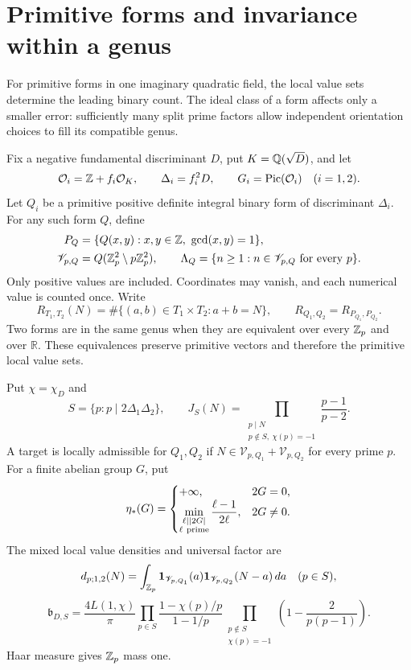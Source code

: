 \section{Primitive forms and invariance within a genus}\label{sec:forms}

For primitive forms in one imaginary quadratic field, the local value
sets determine the leading binary count. The ideal class of a form
affects only a smaller error: sufficiently many split prime factors
allow independent orientation choices to fill its compatible genus.

Fix a negative fundamental discriminant \(D\), put \(K=\mathbb Q(\sqrt D)\),
and let
\[
 \mathcal O_i=\mathbb Z+f_i\mathcal O_K,\qquad
 \Delta_i=f_i^2D,\qquad G_i=\operatorname{Pic}(\mathcal O_i)
 \quad(i=1,2).
\]
Let \(Q_i\) be a primitive positive definite integral binary form of
discriminant \(\Delta_i\). For any such form \(Q\), define
\[
 \begin{aligned}
 P_Q&=\{Q(x,y):x,y\in\mathbb Z,\ \gcd(x,y)=1\},\\
 \mathscr V_{p,Q}&=Q(\mathbb Z_p^2\setminus p\mathbb Z_p^2),\qquad
 \Lambda_Q=\{n\ge1:n\in\mathscr V_{p,Q}\text{ for every }p\}.
 \end{aligned}
\]
Only positive values are included. Coordinates may vanish, and each
numerical value is counted once. Write
\[
 R_{T_1,T_2}(N)=\#\{(a,b)\in T_1\times T_2:a+b=N\},\qquad
 R_{Q_1,Q_2}=R_{P_{Q_1},P_{Q_2}}.
\]
Two forms are in the same genus when they are equivalent over every
\(\mathbb Z_p\) and over \(\mathbb R\). These equivalences preserve primitive
vectors and therefore the primitive local value sets.

Put \(\chi=\chi_D\) and
\[
 S=\{p:p\mid2\Delta_1\Delta_2\},\qquad
 J_S(N)=\prod_{\substack{p\mid N\\p\notin S,\ \chi(p)=-1}}
                              \frac{p-1}{p-2}.
\]
A target is locally admissible for \(Q_1,Q_2\) if
\(N\in\mathscr V_{p,Q_1}+\mathscr V_{p,Q_2}\) for every prime \(p\).
For a finite abelian group \(G\), put
\[
 \eta_*(G)=
 \begin{cases}
 +\infty,&2G=0,\\
 \displaystyle\min_{\substack{\ell\mid |2G|\\\ell\ {\rm prime}}}
                   \frac{\ell-1}{2\ell},&2G\ne0.
 \end{cases}
\]
The mixed local value densities and universal factor are
\[
 d_{p;1,2}(N)=\int_{\mathbb Z_p}
       \mathbf 1_{\mathscr V_{p,Q_1}}(a)\mathbf 1_{\mathscr V_{p,Q_2}}(N-a)\,da
       \quad(p\in S),
\]
\begin{equation}\label{eq:form-universal-factor}
 \mathfrak b_{D,S}=\frac{4L(1,\chi)}\pi
  \prod_{p\in S}\frac{1-\chi(p)/p}{1-1/p}
  \prod_{\substack{p\notin S\\\chi(p)=-1}}
                      \left(1-\frac2{p(p-1)}\right).
\end{equation}
Haar measure gives \(\mathbb Z_p\) mass one.

